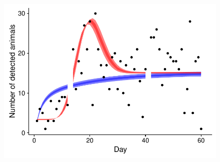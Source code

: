 \documentclass[12pt,english]{article}
\begin{document}
\begin{spacing}{1.9}
    \begin{figure}
      \begin{center}
        \includegraphics[width=170mm]{attendance_fit.pdf}
        \caption{} \label{fig:attend}
      \end{center}
    \end{figure}


  \end{spacing}
\end{document}
